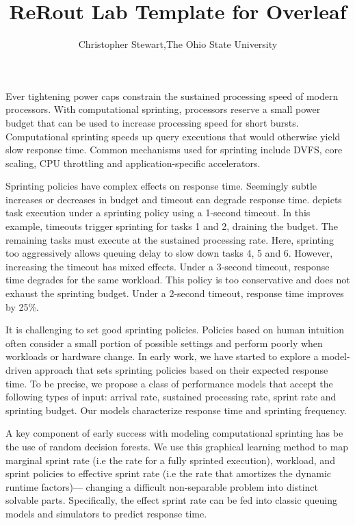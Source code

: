 \documentclass[twocolumn]{article}
\begin{document}
\title{ReRout Lab Template for Overleaf}

\author{Christopher Stewart,The Ohio State University}
\date{}

\maketitle

\vspace{-4.7mm}
Ever tightening power caps constrain the sustained processing speed of modern processors.  With computational sprinting, processors reserve a small power budget that can be used to increase processing speed for short bursts. Computational sprinting speeds up query executions that would otherwise yield slow response time. Common mechanisms used for sprinting include DVFS, core scaling, CPU throttling and application-specific accelerators.



Sprinting policies have complex effects on
response time.  Seemingly subtle increases or
decreases in budget and timeout can degrade response time.
 depicts task
execution under a sprinting policy using a 1-second timeout.
In this example, timeouts trigger sprinting for
tasks 1 and 2, draining the budget.  The remaining tasks must
execute at the sustained processing rate.  Here,
sprinting too aggressively allows queuing delay
to slow down tasks 4, 5 and 6.  However,
increasing the timeout has mixed effects.
Under a 3-second timeout, response time degrades
for the same workload.  This policy is too
conservative and does not exhaust the sprinting
budget.  Under a 2-second timeout, response time
improves by 25\%.  

It is challenging to set good
sprinting policies.  Policies based on human
intuition often consider a small portion of
possible settings and perform poorly when
workloads or hardware change.
In early work, we have started to explore a model-driven approach that sets sprinting policies based on their expected response time. To be precise, we propose a class of performance models that accept the following types of input: arrival rate, sustained processing rate, sprint rate and sprinting budget. Our models characterize response time and sprinting frequency.

A key component of early success with modeling computational sprinting has be the use of random decision forests.  We use this graphical learning method to map marginal sprint rate (i.e the rate for a fully sprinted execution), workload, and sprint policies to effective sprint rate (i.e the rate that amortizes the dynamic runtime factors)--- changing a difficult non-separable problem into distinct solvable parts.  Specifically, the effect sprint rate can be fed into classic queuing models and simulators to predict response time.  
\end{document}
